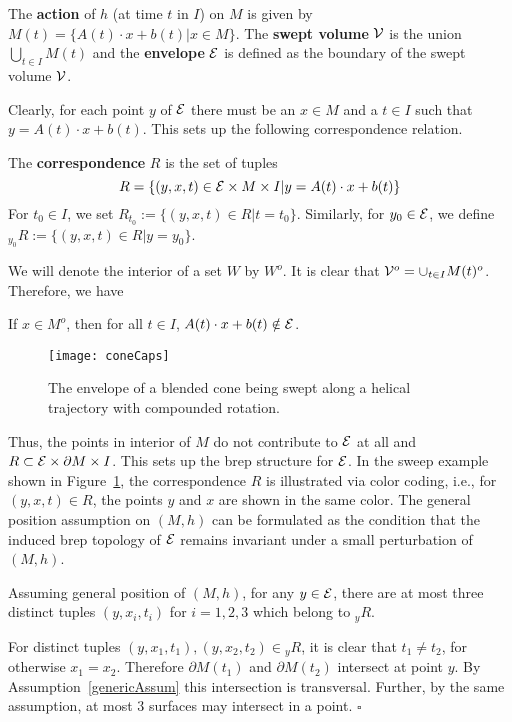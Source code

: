 \documentclass{elsart5p}
\begin{document}
\begin{defn}  \label{envlDef}
The {\bf action} of $h$ (at time $t$ in $I$) on $M$ is given 
by $M(t) = \{ A(t) \cdot x + b(t) | x \in M\}$.  
The {\bf swept volume} ${\cal V}$ is the union 
$\displaystyle \bigcup_{t \in I} M(t)$ and the {\bf envelope} ${\cal E}$ is defined as the 
boundary of the swept volume ${\cal V}$.  
\end{defn}

Clearly, for each point $y$ of ${\cal E}$ there must be an $x \in M$ and a $t \in I$ 
such that $y = A(t) \cdot x + b(t)$.  This sets up the following correspondence relation.


\begin{defn} \label{corrDef}
The {\bf correspondence} $R$ is the set of tuples  
$$R=\{(y,x,t) \in {\cal E} \times M \times I| y = A(t) \cdot x + b(t) \}$$ 
For $t_0 \in I$, we set $R_{t_0} := \{(y,x,t) \in R | t = t_0  \}$. 
Similarly, for $y_0 \in {\cal E}$, we define ${_{y_0}} R := \{(y,x,t) \in R |  y = y_0 \}$.
\end{defn}

We will denote the interior of a set $W$ by $W^o$.
It is clear that ${\cal V}^o = \cup_{t \in I} M(t)^o$. Therefore, we have

\begin{lem} \label{intLem}
If $x \in M^o$, then for all $t \in I$,  $A(t) \cdot x + b(t) \notin {\cal E}$.
\end{lem}

\begin{figure}
 \centering
 \texttt{[image: coneCaps]}
 \caption{The envelope of a blended cone being swept along a helical trajectory with compounded rotation.}
 \label{coneFig}
\end{figure}


Thus, the points in interior of $M$ do not contribute to ${\cal E}$ at all and 
$R \subset {\cal E} \times \partial M \times I$.  This sets up the brep 
structure for ${\cal E}$.
In the sweep example shown in Figure~\ref{coneFig}, 
the correspondence $R$ is illustrated via color coding, i.e.,   
for $(y, x, t) \in R$, the points $y$ and $x$ are shown in the same color.
The general position assumption on $(M,h)$ can be formulated as the condition
that the induced brep topology of ${\cal E}$ remains invariant under a small
perturbation of $(M,h)$.

\begin{lem} \label{preImageLem}
Assuming general position of $(M,h)$, for any $y \in {\cal E}$, there are at 
most three distinct tuples $(y, x_i, t_i)$ for $i = 1,2,3$  which belong to ${_y}R$.
\end{lem}
 For distinct tuples $(y, x_1, t_1), (y, x_2, t_2) 
\in {_y} R$, it is clear that $t_1 \neq t_2$, for otherwise $x_1 = x_2$.
Therefore $\partial M(t_1)$ and $\partial M(t_2)$ intersect 
at point $y$.  By Assumption~\ref{genericAssum} 
this intersection is transversal.  Further, by the same assumption, at most $3$ surfaces may intersect in a 
point. \hfill $\square$
\end{document}

